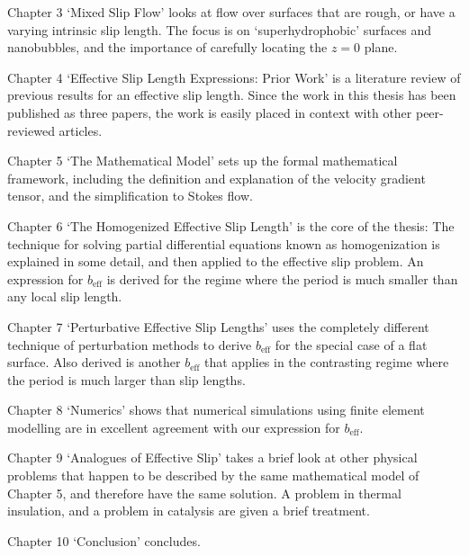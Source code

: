 \documentclass[12pt, a4paper, twoside, openright]{book}
\newcommand{\beff}{\ensuremath{b_{\mathrm{eff}}}}
\begin{document}
Chapter 3 `Mixed Slip Flow' looks at flow over surfaces that are rough, or have a varying intrinsic slip length.  The focus is on `superhydrophobic' surfaces and nanobubbles, and the importance of carefully locating the $z=0$ plane.

Chapter 4 `Effective Slip Length Expressions: Prior Work' is a literature review of previous results for an effective slip length.  Since the work in this thesis has been published as three papers, the work is easily placed in context with other peer-reviewed articles.

Chapter 5 `The Mathematical Model' sets up the formal mathematical framework, including the definition and explanation of the velocity gradient tensor, and the simplification to Stokes flow.

Chapter 6 `The Homogenized Effective Slip Length' is the core of the thesis: The technique for solving partial differential equations known as homogenization is explained in some detail, and then applied to the effective slip problem.  An expression for $\beff$ is derived for the regime where the period is much smaller than any local slip length.

Chapter 7 `Perturbative Effective Slip Lengths' uses the completely different technique of perturbation methods to derive $\beff$ for the special case of a flat surface.  Also derived is another $\beff$ that applies in the contrasting regime where the period is much larger than slip lengths.

Chapter 8 `Numerics' shows that numerical simulations using finite element modelling are in excellent agreement with our expression for $\beff$.

Chapter 9 `Analogues of Effective Slip' takes a brief look at other physical problems that happen to be described by the same mathematical model of Chapter 5, and therefore have the same solution.  A problem in thermal insulation, and a problem in catalysis are given a brief treatment.

Chapter 10 `Conclusion' concludes.



\end{document}
